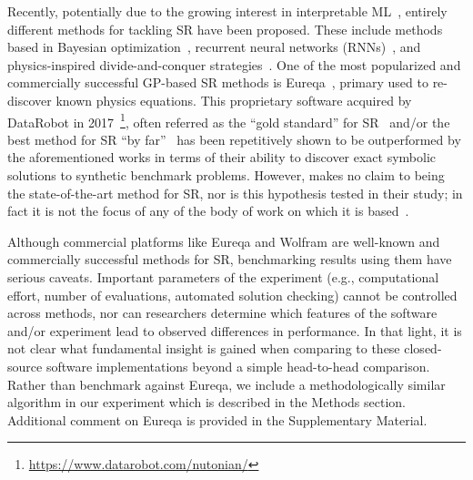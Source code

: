 Recently, potentially due to the growing interest in interpretable ML~\cite{rudinStopExplaining2019}, entirely different methods for tackling SR have been proposed.
These include methods based in Bayesian optimization~\cite{jinBayesianSymbolicRegression2020}, recurrent neural networks (RNNs)~\cite{petersenDeepSymbolicRegression2020}, and physics-inspired divide-and-conquer strategies~\cite{udrescuAIFeynmanPhysicsInspired2020,udrescuAIFeynmanParetooptimal2020}. 
One of the most popularized and commercially successful GP-based SR methods is  Eureqa~\cite{schmidtDistillingFreeformNatural2009}, primary used to re-discover known physics equations. This proprietary software acquired by DataRobot in 2017~\footnote{\url{https://www.datarobot.com/nutonian/}}, often referred as the ``gold standard'' for SR~\cite{petersenDeepSymbolicRegression2020} and/or the best method for SR ``by far''~\cite{udrescuAIFeynmanPhysicsInspired2020} has been repetitively shown to be outperformed by the aforementioned works in terms of their ability to discover exact symbolic solutions to synthetic benchmark problems. 
However, \citet{schmidtDistillingFreeformNatural2009b} makes no claim to being the state-of-the-art method for SR, nor is this hypothesis tested in their study; in fact it is not the focus of any of the body of work on which it is based~\cite{schmidtMachineScienceAutomated2011}. 




Although commercial platforms like Eureqa and Wolfram are well-known and commercially successful methods for SR, benchmarking results using them have serious caveats. 
Important parameters of the experiment (e.g., computational effort, number of evaluations, automated solution checking) cannot be controlled across methods, nor can researchers determine which features of the software and/or experiment lead to observed differences in performance.  
In that light, it is not clear what fundamental insight is gained when comparing to these closed-source software implementations beyond a simple head-to-head comparison.
Rather than benchmark against Eureqa, we include a methodologically similar algorithm in our experiment which is described in the Methods section. Additional comment on Eureqa is provided in the Supplementary Material.

